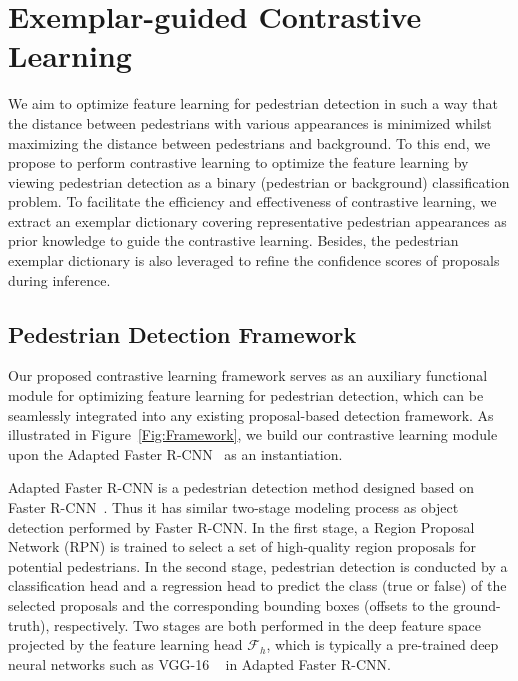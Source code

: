 \documentclass[journal]{IEEEtran}
\begin{document}
\section{Exemplar-guided Contrastive Learning}


We aim to optimize feature learning for pedestrian detection in such a way that the distance between pedestrians with various appearances is minimized whilst maximizing the distance between pedestrians and background. To this end, we propose to perform contrastive learning to optimize the feature learning by viewing pedestrian detection as a binary (pedestrian or background) classification problem. To facilitate the efficiency and effectiveness of contrastive learning, we extract an exemplar dictionary covering representative pedestrian appearances as prior knowledge to guide the contrastive learning. Besides, the pedestrian exemplar dictionary is 
also leveraged to refine the confidence scores of proposals during inference.



\vspace{-7pt}


\subsection{Pedestrian Detection Framework}
Our proposed contrastive learning framework serves as an auxiliary functional module for optimizing feature learning for pedestrian detection, which can be seamlessly integrated into any existing proposal-based detection framework. As illustrated in Figure~\ref{Fig:Framework}, we build our contrastive learning module upon the Adapted Faster R-CNN~\cite{zhang2017citypersons} as an instantiation.

Adapted Faster R-CNN is a pedestrian detection method designed based on Faster R-CNN~\cite{ren2015faster}. Thus it has similar two-stage modeling process as object detection performed by Faster R-CNN. In the first stage, a Region Proposal Network (RPN) is trained to select a set of high-quality region proposals for potential pedestrians. In the second stage, pedestrian detection is conducted by a classification head and a regression head to predict the class (true or false) of the selected proposals and the corresponding bounding boxes (offsets to the ground-truth), respectively. Two stages are both performed in the deep feature space projected by the feature learning head $\mathcal{F}_h$, which is typically a pre-trained deep neural networks such as VGG-16 ~\cite{simonyan2014very} in Adapted Faster R-CNN.
\end{document}
